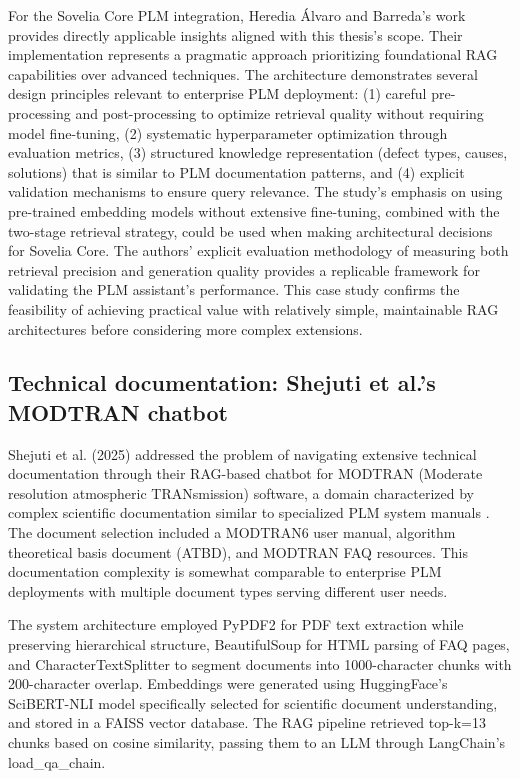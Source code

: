 For the Sovelia Core PLM integration, Heredia Álvaro and Barreda's work provides directly applicable insights aligned with this thesis's scope. Their implementation represents a pragmatic approach prioritizing foundational RAG capabilities over advanced techniques. The architecture demonstrates several design principles relevant to enterprise PLM deployment: (1) careful pre-processing and post-processing to optimize retrieval quality without requiring model fine-tuning, (2) systematic hyperparameter optimization through evaluation metrics, (3) structured knowledge representation (defect types, causes, solutions) that is similar to PLM documentation patterns, and (4) explicit validation mechanisms to ensure query relevance. The study's emphasis on using pre-trained embedding models without extensive fine-tuning, combined with the two-stage retrieval strategy, could be used when making architectural decisions for Sovelia Core. The authors' explicit evaluation methodology of measuring both retrieval precision and generation quality provides a replicable framework for validating the PLM assistant's performance. This case study confirms the feasibility of achieving practical value with relatively simple, maintainable RAG architectures before considering more complex extensions.

\subsection*{Technical documentation: Shejuti et al.'s MODTRAN chatbot}

Shejuti et al. (2025) addressed the problem of navigating extensive technical documentation through their RAG-based chatbot for MODTRAN (Moderate resolution atmospheric TRANsmission) software, a domain characterized by complex scientific documentation similar to specialized PLM system manuals \parencite{shejuti_extended_2025}. The document selection included a MODTRAN6 user manual, algorithm theoretical basis document (ATBD), and MODTRAN FAQ resources. This documentation complexity is somewhat comparable to enterprise PLM deployments with multiple document types serving different user needs.

The system architecture employed PyPDF2 for PDF text extraction while preserving hierarchical structure, BeautifulSoup for HTML parsing of FAQ pages, and CharacterTextSplitter to segment documents into 1000-character chunks with 200-character overlap. Embeddings were generated using HuggingFace's SciBERT-NLI model specifically selected for scientific document understanding, and stored in a FAISS vector database. The RAG pipeline retrieved top-k=13 chunks based on cosine similarity, passing them to an LLM through LangChain's load\_qa\_chain.

